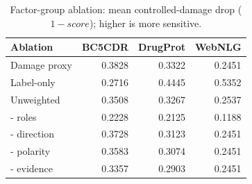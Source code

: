 \begin{table}[t]
\centering
\caption{Factor-group ablation: mean controlled-damage drop ($1-score$); higher is more sensitive.}
\label{tab:ablation}
\scriptsize
\begin{tabular}{lrrr}
\toprule
Ablation & BC5CDR & DrugProt & WebNLG \\
\midrule
Damage proxy & 0.3828 & 0.3322 & 0.2451 \\
Label-only & 0.2716 & 0.4445 & 0.5352 \\
Unweighted & 0.3508 & 0.3267 & 0.2537 \\
- roles & 0.2228 & 0.2125 & 0.1188 \\
- direction & 0.3728 & 0.3123 & 0.2451 \\
- polarity & 0.3583 & 0.3074 & 0.2451 \\
- evidence & 0.3357 & 0.2903 & 0.2451 \\
\bottomrule
\end{tabular}
\end{table}
